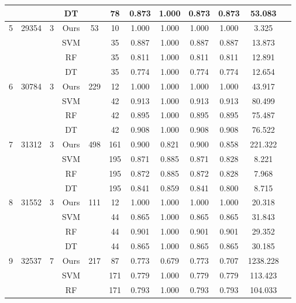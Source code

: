 \begin{table}[htbp]
\begin{tabular}{cccccccccccc}
           &       &   & DT   &     & 78  & 0.873 & 1.000 & 0.873 & 0.873 & 53.083 \\
        \midrule
        5  & 29354 & 3 & Ours & 53  & 10  & 1.000 & 1.000 & 1.000 & 1.000 & 3.325 \\
           &       &   & SVM  &     & 35  & 0.887 & 1.000 & 0.887 & 0.887 & 13.873 \\
           &       &   & RF   &     & 35  & 0.811 & 1.000 & 0.811 & 0.811 & 12.891 \\
           &       &   & DT   &     & 35  & 0.774 & 1.000 & 0.774 & 0.774 & 12.654 \\
        \midrule
        6  & 30784 & 3 & Ours & 229 & 12  & 1.000 & 1.000 & 1.000 & 1.000 & 43.917 \\
           &       &   & SVM  &     & 42  & 0.913 & 1.000 & 0.913 & 0.913 & 80.499 \\
           &       &   & RF   &     & 42  & 0.895 & 1.000 & 0.895 & 0.895 & 75.487 \\
           &       &   & DT   &     & 42  & 0.908 & 1.000 & 0.908 & 0.908 & 76.522 \\
        \midrule
        7  & 31312 & 3 & Ours & 498 & 161 & 0.900 & 0.821 & 0.900 & 0.858 & 221.322 \\
           &       &   & SVM  &     & 195 & 0.871 & 0.885 & 0.871 & 0.828 & 8.221 \\
           &       &   & RF   &     & 195 & 0.872 & 0.885 & 0.872 & 0.828 & 7.968 \\
           &       &   & DT   &     & 195 & 0.841 & 0.859 & 0.841 & 0.800 & 8.715 \\
     \midrule
        8  & 31552 & 3 & Ours & 111 & 12 & 1.000 & 1.000 & 1.000 & 1.000 & 20.318 \\
           &       &   & SVM  &     & 44  & 0.865 & 1.000 & 0.865 & 0.865 & 31.843 \\
           &       &   & RF   &     & 44  & 0.901 & 1.000 & 0.901 & 0.901 & 29.352 \\
           &       &   & DT   &     & 44  & 0.865 & 1.000 & 0.865 & 0.865 & 30.185 \\
        \midrule
        9  & 32537 & 7 & Ours & 217 & 87  & 0.773 & 0.679 & 0.773 & 0.707 & 1238.228 \\
           &       &   & SVM  &     & 171 & 0.779 & 1.000 & 0.779 & 0.779 & 113.423 \\
           &       &   & RF   &     & 171 & 0.793 & 1.000 & 0.793 & 0.793 & 104.033 \\

\end{tabular}
\end{table}
